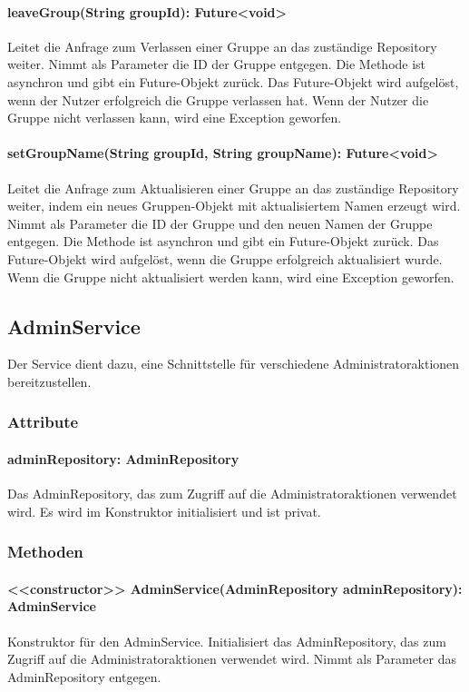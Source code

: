 \documentclass[parskip=full]{scrartcl}
\begin{document}
\paragraph{leaveGroup(String groupId): Future<void>}
Leitet die Anfrage zum Verlassen einer Gruppe an das zuständige Repository weiter. Nimmt als Parameter die ID der Gruppe entgegen. Die Methode ist asynchron und gibt ein Future-Objekt zurück. Das Future-Objekt wird aufgelöst, wenn der Nutzer erfolgreich die Gruppe verlassen hat. Wenn der Nutzer die Gruppe nicht verlassen kann, wird eine Exception geworfen.
\paragraph{setGroupName(String groupId, String groupName): Future<void>}
Leitet die Anfrage zum Aktualisieren einer Gruppe an das zuständige Repository weiter, indem ein neues Gruppen-Objekt mit aktualisiertem Namen erzeugt wird. Nimmt als Parameter die ID der Gruppe und den neuen Namen der Gruppe entgegen. Die Methode ist asynchron und gibt ein Future-Objekt zurück. Das Future-Objekt wird aufgelöst, wenn die Gruppe erfolgreich aktualisiert wurde. Wenn die Gruppe nicht aktualisiert werden kann, wird eine Exception geworfen.

\subsection{AdminService}
Der Service dient dazu, eine Schnittstelle für verschiedene Administratoraktionen bereitzustellen.
\subsubsection{Attribute}
\paragraph{adminRepository: AdminRepository}
Das AdminRepository, das zum Zugriff auf die Administratoraktionen verwendet wird. Es wird im Konstruktor initialisiert und ist privat.
\subsubsection{Methoden}
\paragraph{<<constructor>> AdminService(AdminRepository adminRepository): AdminService}
Konstruktor für den AdminService. Initialisiert das AdminRepository, das zum Zugriff auf die Administratoraktionen verwendet wird. Nimmt als Parameter das AdminRepository entgegen.
\end{document}
